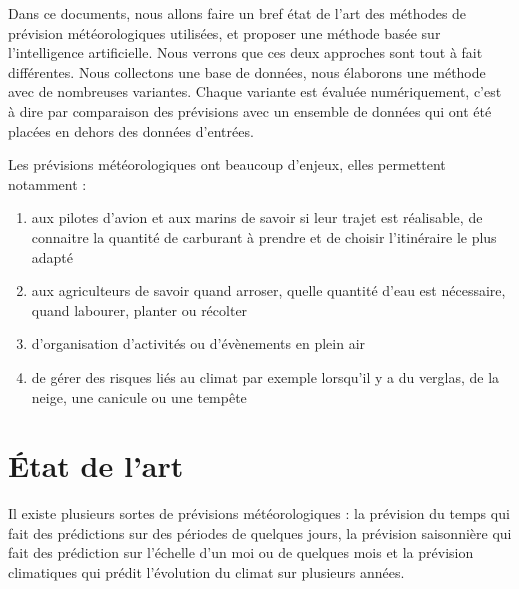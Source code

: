 \documentclass[11pt,a4paper]{article}
\begin{document}
Dans ce documents, nous allons faire un bref état de l'art des méthodes de prévision météorologiques utilisées, et proposer une méthode basée sur l'intelligence artificielle. Nous verrons que ces deux approches sont tout à fait différentes. Nous collectons une base de données, nous élaborons une méthode avec de nombreuses variantes. Chaque variante est évaluée numériquement, c'est à dire par comparaison des prévisions avec un ensemble de données qui ont été placées en dehors des données d'entrées.

 \vspace {0.6cm}
Les prévisions météorologiques ont beaucoup d'enjeux, elles permettent notamment :
\begin {enumerate}
\item aux pilotes d'avion et aux marins de savoir si leur trajet est réalisable, de connaitre la quantité de carburant à prendre et de choisir l'itinéraire le plus adapté
\item aux agriculteurs de savoir quand arroser, quelle quantité d'eau est nécessaire, quand labourer, planter ou récolter 
\item d'organisation d'activités ou d'évènements en plein air
\item de gérer des risques liés au climat par exemple lorsqu'il y a du verglas, de la neige, une canicule ou une tempête
\end{enumerate}

 
\section{État de l'art}

Il existe plusieurs sortes de prévisions météorologiques : la prévision du temps qui fait des prédictions sur des périodes de quelques jours, la prévision saisonnière qui fait des prédiction sur l'échelle d'un moi ou de quelques mois et la prévision climatiques qui prédit l'évolution du climat sur plusieurs années.
\end{document}
